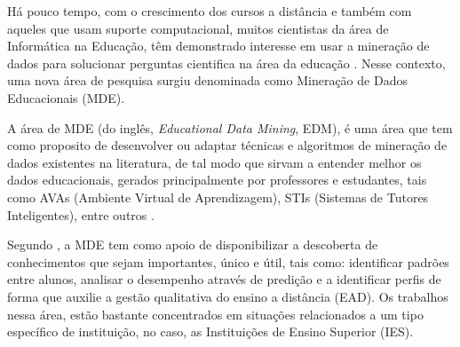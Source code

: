 \par
Há pouco tempo, com o crescimento dos cursos a distância e também com aqueles que usam suporte computacional, muitos cientistas da área de Informática na Educação, têm demonstrado interesse em usar a mineração de dados para solucionar perguntas cientifica na área da educação \cite{Baker2011}. Nesse contexto, uma nova área de pesquisa surgiu denominada como Mineração de Dados Educacionais (MDE).

\par
A área de MDE (do inglês, \textit{Educational Data Mining}, EDM), é uma área que tem como proposito de desenvolver ou adaptar técnicas e algoritmos de mineração de dados existentes na literatura, de tal modo que sirvam a entender melhor os dados educacionais, gerados principalmente por professores e estudantes, tais como AVAs (Ambiente Virtual de Aprendizagem), STIs (Sistemas de Tutores Inteligentes), entre outros \cite{Costa2012, Marques2014}.

\par
Segundo , a MDE tem como apoio de disponibilizar a descoberta de conhecimentos que sejam importantes, único e útil, tais como: identificar padrões entre alunos, analisar o desempenho através de predição e a identificar perfis de forma que auxilie a gestão qualitativa do ensino a distância (EAD). Os trabalhos nessa área, estão bastante concentrados em situações relacionados a um tipo específico de instituição, no caso, as Instituições de Ensino Superior (IES).

\par

